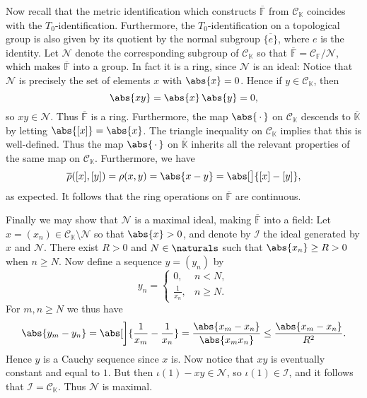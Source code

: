 \documentclass[a4paper, 11pt]{memoir}
\theoremstyle{plaincustomnumber}
\theoremstyle{changedotbreakcustomnumber}
\newcommand{\calN}{\mathcal{N}}
\newcommand{\calI}{\mathcal{I}}
\newcommand{\calC}{\mathcal{C}}
\newcommand{\field}{\mathbb{F}}
\newcommand{\fieldK}{\mathbb{K}}
\begin{document}
Now recall that the metric identification which constructs $\overline{\field}$ from $\calC_\fieldK$ coincides with the $T_0$-identification. Furthermore, the $T_0$-identification on a topological group is also given by its quotient by the normal subgroup $\overline{\{e\}}$, where $e$ is the identity. Let $\calN$ denote the corresponding subgroup of $\calC_\fieldK$ so that $\overline{\field} = \calC_\field / \calN$, which makes $\overline{\field}$ into a group. In fact it is a ring, since $\calN$ is an ideal: Notice that $\calN$ is precisely the set of elements $x$ with $\abs{x} = 0$. Hence if $y \in \calC_\fieldK$, then
%
\begin{equation*}
    \abs{xy}
        = \abs{x} \, \abs{y}
        = 0,
\end{equation*}
%
so $xy \in \calN$. Thus $\overline{\field}$ is a ring. Furthermore, the map $\abs{\,\cdot\,}$ on $\calC_\fieldK$ descends to $\overline{\fieldK}$ by letting $\abs{[x]} = \abs{x}$. The triangle inequality on $\calC_\fieldK$ implies that this is well-defined. Thus the map $\abs{\,\cdot\,}$ on $\overline{\fieldK}$ inherits all the relevant properties of the same map on $\calC_\fieldK$. Furthermore, we have
%
\begin{equation*}
    \overline{\rho}([x],[y])
        = \rho(x,y)
        = \abs{x - y}
        = \abs[\big]{[x] - [y]},
\end{equation*}
%
as expected. It follows that the ring operations on $\overline{\field}$ are continuous.

Finally we may show that $\calN$ is a maximal ideal, making $\overline{\field}$ into a field: Let $x = (x_n) \in \calC_\fieldK \setminus \calN$ so that $\abs{x} > 0$, and denote by $\calI$ the ideal generated by $x$ and $\calN$. There exist $R > 0$ and $N \in \naturals$ such that $\abs{x_n} \geq R > 0$ when $n \geq N$. Now define a sequence $y = (y_n)$ by
%
\begin{equation*}
    y_n =
    \begin{cases}
        0, & n < N, \\
        \tfrac{1}{x_n}, & n \geq N.
    \end{cases}
\end{equation*}
%
For $m,n \geq N$ we thus have
%
\begin{equation*}
    \abs{y_m - y_n}
        = \abs[\bigg]{\frac{1}{x_m} - \frac{1}{x_n}}
        = \frac{ \abs{x_m - x_n} }{ \abs{x_m x_n} }
        \leq \frac{ \abs{x_m - x_n} }{ R^2 }.
\end{equation*}
%
Hence $y$ is a Cauchy sequence since $x$ is. Now notice that $xy$ is eventually constant and equal to $1$. But then $\iota(1) - xy \in \calN$, so $\iota(1) \in \calI$, and it follows that $\calI = \calC_\fieldK$. Thus $\calN$ is maximal.
\end{document}
